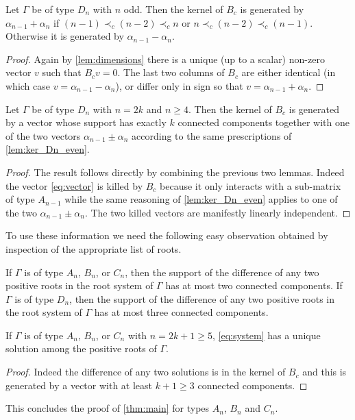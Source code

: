 \documentclass[pdftex]{sigma}
\numberwithin{equation}{section}
\numberwithin{theorem}{section}
\numberwithin{proposition}{section}
\numberwithin{lemma}{section}
\numberwithin{corollary}{section}
\numberwithin{definition}{section}
\numberwithin{example}{section}
\numberwithin{remark}{section}
\numberwithin{note}{section}
\begin{document}
  \begin{lemma}
    \label{lem:ker_Dn_even}
    Let $\Gamma$ be of type $D_n$ with $n$ odd.
    Then the kernel of $B_c$ is generated by $\alpha_{n-1}+\alpha_n$ if $(n-1) \prec_c (n-2) \prec_c n$ or $n \prec_c (n-2) \prec_c (n-1)$.
    Otherwise it is generated by $\alpha_{n-1}-\alpha_n$.
  \end{lemma}
  \begin{proof}
    Again by \cref{lem:dimensions} there is a unique (up to a scalar) non-zero vector $v$ such that $B_cv=0$.
    The last two columns of $B_c$ are either identical (in which case $v=\alpha_{n-1}-\alpha_n$), or differ only in sign so that $v=\alpha_{n-1}+\alpha_n$.
  \end{proof}

  \begin{lemma}
    Let $\Gamma$ be of type $D_n$ with $n=2k$ and $n\geq 4$.
    Then the kernel of $B_c$ is generated by a vector whose support has exactly $k$ connected components together with one of the two vectors $\alpha_{n-1}\pm\alpha_n$ according to the same prescriptions of \cref{lem:ker_Dn_even}.
  \end{lemma}
  \begin{proof}
    The result follows directly by combining the previous two lemmas.
    Indeed the vector \cref{eq:vector} is killed by $B_c$ because it only interacts with a sub-matrix of type $A_{n-1}$ while the same reasoning of \cref{lem:ker_Dn_even} applies to one of the two $\alpha_{n-1}\pm\alpha_n$.
    The two killed vectors are manifestly linearly independent.
  \end{proof}

  To use these information we need the following easy observation obtained by inspection of the appropriate list of roots.
  \begin{lemma}
    \label{lem:components}
    If $\Gamma$ is of type $A_n$, $B_n$, or $C_n$, then the support of the difference of any two positive roots in the root system of $\Gamma$ has at most two connected components.
    If $\Gamma$ is of type $D_n$, then the support of the difference of any two positive roots in the root system of $\Gamma$ has at most three connected components.
  \end{lemma}

  \begin{corollary}
    If $\Gamma$ is of type $A_n$, $B_n$, or $C_n$ with $n=2k+1\geq 5$, \cref{eq:system} has a unique solution among the positive roots of $\Gamma$.
  \end{corollary}
  \begin{proof}
    Indeed the difference of any two solutions is in the kernel of $B_c$ and this is generated by a vector with at least $k+1\geq3$ connected components.
  \end{proof}
  This concludes the proof of \cref{thm:main} for types $A_n$, $B_n$ and $C_n$.
\end{document}
